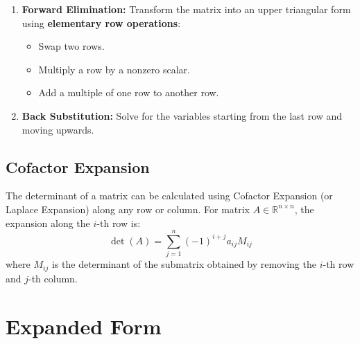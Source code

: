 \documentclass{article}
\begin{document}
\begin{enumerate}
    \item \textbf{Forward Elimination:} Transform the matrix into an upper triangular form using \textbf{elementary row operations}:
    \begin{itemize}
        \item Swap two rows.
        \item Multiply a row by a nonzero scalar.
        \item Add a multiple of one row to another row.
    \end{itemize}
    \item \textbf{Back Substitution:} Solve for the variables starting from the last row and moving upwards.
\end{enumerate}

\subsection{Cofactor Expansion}
\label{subsec:cofactor}
The determinant of a matrix can be calculated using Cofactor Expansion (or Laplace Expansion) along any row or column. For matrix $A \in \mathbb{R}^{n \times n}$, the expansion along the $i$-th row is:
\[
    \det(A) = \sum_{j=1}^{n} (-1)^{i+j} a_{ij} M_{ij}
\]
where $M_{ij}$ is the determinant of the submatrix obtained by removing the $i$-th row and $j$-th column.


\newpage
\appendix
\section{Expanded Form}
\end{document}

